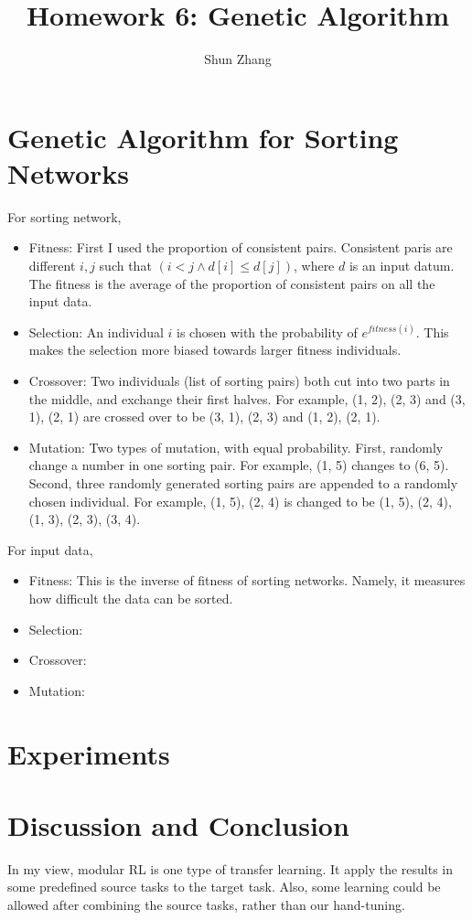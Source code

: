 \documentclass[11pt]{article}
\title{Homework 6: Genetic Algorithm}
\author{Shun Zhang}
\date{}
\begin{document}
\maketitle

\section{Genetic Algorithm for Sorting Networks}

For sorting network,

\begin{itemize}
\item Fitness: First I used the proportion of consistent pairs.
Consistent paris are different $i, j$ such that $(i < j \land d[i]
\leq d[j])$, where $d$ is an input datum. The fitness is the average
of the proportion of consistent pairs on all the input data. 

\item Selection: An individual $i$ is chosen with the probability of
$e^{fitness(i)}$. This makes the selection more biased towards larger
fitness individuals.

\item Crossover: Two individuals (list of sorting pairs) both cut into
two parts in the middle, and exchange their first halves. For example,
(1, 2), (2, 3) and (3, 1), (2, 1) are crossed over to be (3, 1), (2,
3) and (1, 2), (2, 1).

\item Mutation: Two types of mutation, with equal probability. First,
randomly change a number in one sorting pair. For example, (1, 5)
changes to (6, 5). Second, three randomly generated sorting pairs are
appended to a randomly chosen individual. For example, (1, 5), (2, 4)
is changed to be (1, 5), (2, 4), (1, 3), (2, 3), (3, 4).
\end{itemize}

For input data,

\begin{itemize}
\item Fitness: This is the inverse of fitness of sorting networks.
Namely, it measures how difficult the data can be sorted.
\item Selection:
\item Crossover:
\item Mutation:
\end{itemize}

\section{Experiments}

\section{Discussion and Conclusion}

In my view, modular RL is one type of transfer learning. It apply the
results in some predefined source tasks to the target task. Also, some
learning could be allowed after combining the source tasks, rather
than our hand-tuning.
\end{document}
